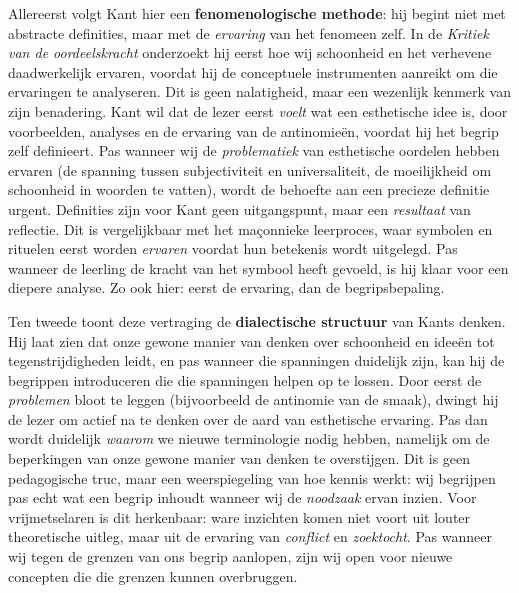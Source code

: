 \begin{mdframed}[leftmargin=0pt,rightmargin=0pt,backgroundcolor=blue!6,linecolor=white,innertopmargin=6pt,innerbottommargin=6pt]
Allereerst volgt Kant hier een \textbf{fenomenologische methode}: hij begint niet met abstracte definities, maar met de \textit{ervaring} van het fenomeen zelf. In de \textit{Kritiek van de oordeelskracht} onderzoekt hij eerst hoe wij schoonheid en het verhevene daadwerkelijk ervaren, voordat hij de conceptuele instrumenten aanreikt om die ervaringen te analyseren. Dit is geen nalatigheid, maar een wezenlijk kenmerk van zijn benadering. Kant wil dat de lezer eerst \textit{voelt} wat een esthetische idee is, door voorbeelden, analyses en de ervaring van de antinomieën, voordat hij het begrip zelf definieert. Pas wanneer wij de \textit{problematiek} van esthetische oordelen hebben ervaren (de spanning tussen subjectiviteit en universaliteit, de moeilijkheid om schoonheid in woorden te vatten), wordt de behoefte aan een precieze definitie urgent. Definities zijn voor Kant geen uitgangspunt, maar een \textit{resultaat} van reflectie. Dit is vergelijkbaar met het maçonnieke leerproces, waar symbolen en rituelen eerst worden \textit{ervaren} voordat hun betekenis wordt uitgelegd. Pas wanneer de leerling de kracht van het symbool heeft gevoeld, is hij klaar voor een diepere analyse. Zo ook hier: eerst de ervaring, dan de begripsbepaling.

Ten tweede toont deze vertraging de \textbf{dialectische structuur} van Kants denken. Hij laat zien dat onze gewone manier van denken over schoonheid en ideeën tot tegenstrijdigheden leidt, en pas wanneer die spanningen duidelijk zijn, kan hij de begrippen introduceren die die spanningen helpen op te lossen. Door eerst de \textit{problemen} bloot te leggen (bijvoorbeeld de antinomie van de smaak), dwingt hij de lezer om actief na te denken over de aard van esthetische ervaring. Pas dan wordt duidelijk \textit{waarom} we nieuwe terminologie nodig hebben, namelijk om de beperkingen van onze gewone manier van denken te overstijgen. Dit is geen pedagogische truc, maar een weerspiegeling van hoe kennis werkt: wij begrijpen pas echt wat een begrip inhoudt wanneer wij de \textit{noodzaak} ervan inzien. Voor vrijmetselaren is dit herkenbaar: ware inzichten komen niet voort uit louter theoretische uitleg, maar uit de ervaring van \textit{conflict} en \textit{zoektocht}. Pas wanneer wij tegen de grenzen van ons begrip aanlopen, zijn wij open voor nieuwe concepten die die grenzen kunnen overbruggen.


\end{mdframed}
